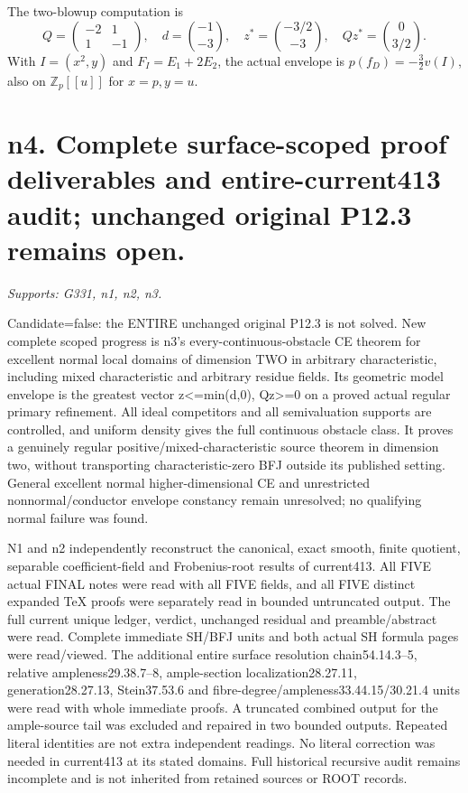\documentclass[11pt]{article}
\begin{document}
The two-blowup computation is
\[
 Q=\begin{pmatrix}-2&1\\1&-1\end{pmatrix},\quad
 d=\binom{-1}{-3},\quad z^*=\binom{-3/2}{-3},\quad
 Qz^*=\binom0{3/2}.
\]
With $I=(x^2,y)$ and $F_I=E_1+2E_2$, the actual envelope is
$p(f_D)=-\tfrac32 v(I)$, also on $\mathbb Z_p[[u]]$ for $x=p,y=u$.

\section{n4. Complete surface-scoped proof deliverables and entire-current413 audit; unchanged original P12.3 remains open.}
\textit{Supports: G331, n1, n2, n3.}

Candidate=false: the ENTIRE unchanged original P12.3 is not solved. New complete scoped progress is n3's every-continuous-obstacle CE theorem for excellent normal local domains of dimension TWO in arbitrary characteristic, including mixed characteristic and arbitrary residue fields. Its geometric model envelope is the greatest vector z<=min(d,0), Qz>=0 on a proved actual regular primary refinement. All ideal competitors and all semivaluation supports are controlled, and uniform density gives the full continuous obstacle class. It proves a genuinely regular positive/mixed-characteristic source theorem in dimension two, without transporting characteristic-zero BFJ outside its published setting. General excellent normal higher-dimensional CE and unrestricted nonnormal/conductor envelope constancy remain unresolved; no qualifying normal failure was found.

N1 and n2 independently reconstruct the canonical, exact smooth, finite quotient, separable coefficient-field and Frobenius-root results of current413. All FIVE actual FINAL notes were read with all FIVE fields, and all FIVE distinct expanded TeX proofs were separately read in bounded untruncated output. The full current unique ledger, verdict, unchanged residual and preamble/abstract were read. Complete immediate SH/BFJ units and both actual SH formula pages were read/viewed. The additional entire surface resolution chain54.14.3--5, relative ampleness29.38.7--8, ample-section localization28.27.11, generation28.27.13, Stein37.53.6 and fibre-degree/ampleness33.44.15/30.21.4 units were read with whole immediate proofs. A truncated combined output for the ample-source tail was excluded and repaired in two bounded outputs. Repeated literal identities are not extra independent readings. No literal correction was needed in current413 at its stated domains. Full historical recursive audit remains incomplete and is not inherited from retained sources or ROOT records.
\end{document}
